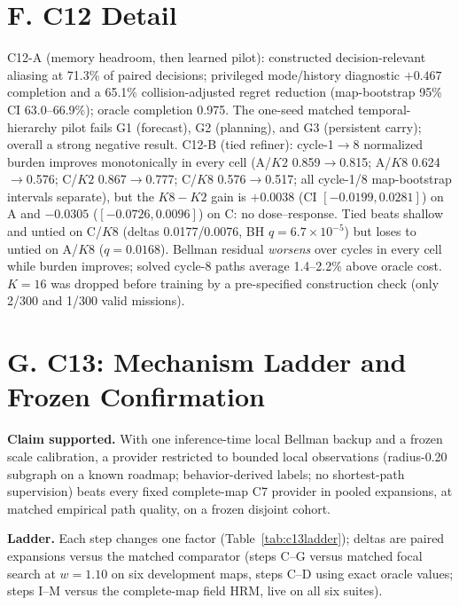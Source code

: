 \documentclass[letterpaper]{article} %
\newcommand{\stage}[1]{\textsc{#1}}
\begin{document}
\section{F. \stage{C12} Detail}

\stage{C12-A} (memory headroom, then learned pilot): constructed decision-relevant aliasing at 71.3\% of paired decisions; privileged mode/history diagnostic $+0.467$ completion and a 65.1\% collision-adjusted regret reduction (map-bootstrap 95\% CI 63.0--66.9\%); oracle completion 0.975. The one-seed matched temporal-hierarchy pilot fails G1 (forecast), G2 (planning), and G3 (persistent carry); overall a strong negative result. \stage{C12-B} (tied refiner): cycle-1$\to$8 normalized burden improves monotonically in every cell (A/$K2$ 0.859$\to$0.815; A/$K8$ 0.624$\to$0.576; C/$K2$ 0.867$\to$0.777; C/$K8$ 0.576$\to$0.517; all cycle-1/8 map-bootstrap intervals separate), but the $K8{-}K2$ gain is $+0.0038$ (CI $[-0.0199, 0.0281]$) on A and $-0.0305$ ($[-0.0726, 0.0096]$) on C: no dose--response. Tied beats shallow and untied on C/$K8$ (deltas 0.0177/0.0076, BH $q{=}6.7{\times}10^{-5}$) but loses to untied on A/$K8$ ($q{=}0.0168$). Bellman residual \emph{worsens} over cycles in every cell while burden improves; solved cycle-8 paths average 1.4--2.2\% above oracle cost. $K{=}16$ was dropped before training by a pre-specified construction check (only 2/300 and 1/300 valid missions).

\section{G. C13: Mechanism Ladder and Frozen Confirmation}

\textbf{Claim supported.} With one inference-time local Bellman backup and a frozen scale calibration, a provider restricted to bounded local observations (radius-0.20 subgraph on a known roadmap; behavior-derived labels; no shortest-path supervision) beats every fixed complete-map \stage{C7} provider in pooled expansions, at matched empirical path quality, on a frozen disjoint cohort.

\textbf{Ladder.} Each step changes one factor (Table~\ref{tab:c13ladder}); deltas are paired expansions versus the matched comparator (steps C--G versus matched focal search at $w{=}1.10$ on six development maps, steps C--D using exact oracle values; steps I--M versus the complete-map field HRM, live on all six suites).
\end{document}
